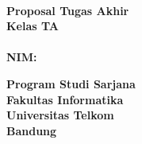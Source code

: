 {\centering
\large
{\bigsize\bf \Title}\\
\vspace{ 2cm}
\rm
\textbf{Proposal Tugas Akhir}\\
\vspace{0.5 cm}
\textbf{Kelas TA \Kelas}\\
\vspace{0.5 cm}
\textbf{\Author}\\ \textbf{NIM: \NIM}\\ 

\vspace{1.5 cm}

\begin{figure}[h]
{\par}
\end{figure}

\vspace{2 cm}
{\bigsize\textbf{Program Studi Sarjana \Prodi}\\
\vspace{0.5 cm}
\textbf{Fakultas Informatika}\\
\vspace{0.5 cm}
\textbf{Universitas Telkom}\\
\vspace{0.5 cm}
\textbf{Bandung}\\
\vspace{0.5 cm}
\textbf{\Date}\\}
}